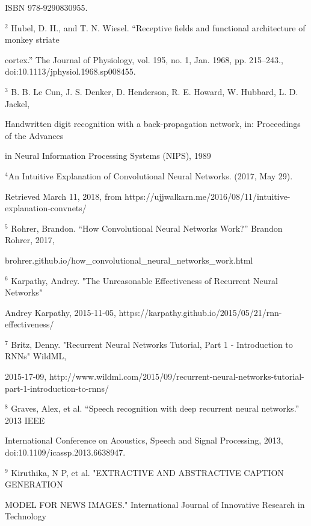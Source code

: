 \documentclass[10pt, oneside]{article}   	%
\begin{document}
ISBN 978-9290830955.

\vspace{3mm}
$^2$ Hubel, D. H., and T. N. Wiesel. “Receptive fields and functional architecture of monkey striate 

cortex.” The Journal of Physiology, vol. 195, no. 1, Jan. 1968, pp. 215–243., doi:10.1113/jphysiol.1968.sp008455. 

\vspace{3mm}
$^3$ B. B. Le Cun, J. S. Denker, D. Henderson, R. E. Howard, W. Hubbard, L. D. Jackel, 

Handwritten digit recognition with a back-propagation network, in:  Proceedings of the Advances

in Neural Information Processing Systems (NIPS), 1989


\vspace{3mm}
$^4$An Intuitive Explanation of Convolutional Neural Networks. (2017, May 29).

Retrieved March 11, 2018, from https://ujjwalkarn.me/2016/08/11/intuitive-explanation-convnets/

\vspace{3mm}
$^5$ Rohrer, Brandon. “How Convolutional Neural Networks Work?” Brandon Rohrer, 2017, 

brohrer.github.io/how\_convolutional\_neural\_networks\_work.html 

\vspace{3mm}
$^6$ Karpathy, Andrey. "The Unreasonable Effectiveness of Recurrent Neural Networks"

Andrey Karpathy, 2015-11-05, https://karpathy.github.io/2015/05/21/rnn-effectiveness/

\vspace{3mm}
$^7$ Britz, Denny. "Recurrent Neural Networks Tutorial, Part 1 - Introduction to RNNs" WildML,

2015-17-09, 
http://www.wildml.com/2015/09/recurrent-neural-networks-tutorial-part-1-introduction-to-rnns/

\vspace{3mm}
$^8$ Graves, Alex, et al. “Speech recognition with deep recurrent neural networks.” 2013 IEEE 

International Conference on Acoustics, Speech and Signal Processing, 2013, doi:10.1109/icassp.2013.6638947. 

\vspace{3mm}
$^9$ Kiruthika, N P, et al. "EXTRACTIVE AND ABSTRACTIVE CAPTION GENERATION 

MODEL FOR NEWS IMAGES." International Journal of Innovative Research in Technology 
\end{document}
